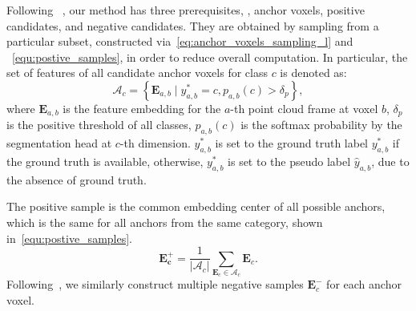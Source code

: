 \documentclass[10pt,twocolumn,letterpaper]{article}
\begin{document}
Following ~\cite{oord2019representation,he2020momentum}, our method has three prerequisites, \ie, anchor voxels, positive candidates, and negative candidates. They are obtained by sampling from a particular subset, constructed via~\cref{eq:anchor_voxels_sampling_l} and ~\cref{equ:postive_samples}, in order to reduce overall computation. In particular, the set of features of all candidate anchor voxels for class $c$ is denoted as:
\begin{equation} \label{eq:anchor_voxels_sampling_l}
    \mathcal{A}_c=\left\{\mathbf{E}_{a,b} \mid y^{*}_{a,b}=c, p_{a,b}(c)>\delta_p\right\},
\end{equation}
where $\mathbf{E}_{a,b}$ is the feature embedding for the $a$-th point cloud frame at voxel $b$, $\delta_p$ is the positive threshold of all classes, $p_{a,b}(c)$ is the softmax probability by the segmentation head at $c$-th dimension. 
$y^{*}_{a,b}$ is set to the ground truth label $y^{*}_{a,b}$ if the ground truth is available, otherwise, $y^{*}_{a,b}$ is set to the pseudo label $\hat{y}_{a,b}$, due to the absence of ground truth.


The positive sample is the common embedding center of all possible anchors, which is the same for all anchors from the same category, shown in~\cref{equ:postive_samples}.
\begin{equation}\label{equ:postive_samples}
    \mathbf{E_c^+} = \frac{1}{\left\lvert \mathcal{A}_c \right\rvert} \sum_{\textbf{E}_c \in \mathcal{A}_c}{\textbf{E}_c}.
\end{equation}
Following~\cite{wang2022semisupervised}, we similarly construct multiple negative samples $\textbf{E}_c^-$ for each anchor voxel.
\end{document}
